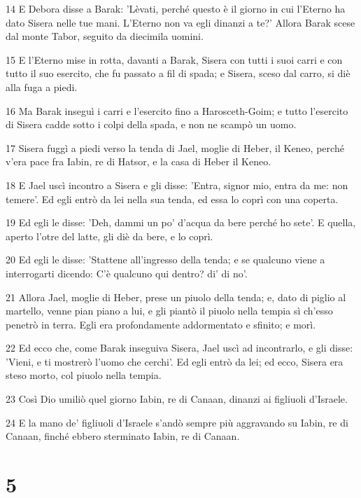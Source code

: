 \par 14 E Debora disse a Barak: 'Lèvati, perché questo è il giorno in cui l'Eterno ha dato Sisera nelle tue mani. L'Eterno non va egli dinanzi a te?' Allora Barak scese dal monte Tabor, seguito da diecimila uomini.
\par 15 E l'Eterno mise in rotta, davanti a Barak, Sisera con tutti i suoi carri e con tutto il suo esercito, che fu passato a fil di spada; e Sisera, sceso dal carro, si diè alla fuga a piedi.
\par 16 Ma Barak inseguì i carri e l'esercito fino a Harosceth-Goim; e tutto l'esercito di Sisera cadde sotto i colpi della spada, e non ne scampò un uomo.
\par 17 Sisera fuggì a piedi verso la tenda di Jael, moglie di Heber, il Keneo, perché v'era pace fra Iabin, re di Hatsor, e la casa di Heber il Keneo.
\par 18 E Jael uscì incontro a Sisera e gli disse: 'Entra, signor mio, entra da me: non temere'. Ed egli entrò da lei nella sua tenda, ed essa lo coprì con una coperta.
\par 19 Ed egli le disse: 'Deh, dammi un po' d'acqua da bere perché ho sete'. E quella, aperto l'otre del latte, gli diè da bere, e lo coprì.
\par 20 Ed egli le disse: 'Stattene all'ingresso della tenda; e se qualcuno viene a interrogarti dicendo: C'è qualcuno qui dentro? di' di no'.
\par 21 Allora Jael, moglie di Heber, prese un piuolo della tenda; e, dato di piglio al martello, venne pian piano a lui, e gli piantò il piuolo nella tempia sì ch'esso penetrò in terra. Egli era profondamente addormentato e sfinito; e morì.
\par 22 Ed ecco che, come Barak inseguiva Sisera, Jael uscì ad incontrarlo, e gli disse: 'Vieni, e ti mostrerò l'uomo che cerchi'. Ed egli entrò da lei; ed ecco, Sisera era steso morto, col piuolo nella tempia.
\par 23 Così Dio umiliò quel giorno Iabin, re di Canaan, dinanzi ai figliuoli d'Israele.
\par 24 E la mano de' figliuoli d'Israele s'andò sempre più aggravando su Iabin, re di Canaan, finché ebbero sterminato Iabin, re di Canaan.

\chapter{5}

